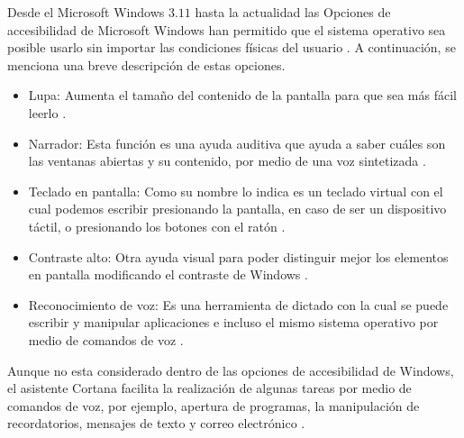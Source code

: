 Desde el Microsoft Windows $3.11$ \cite{RomeroZunica1998} hasta la actualidad las 
 Opciones de accesibilidad de Microsoft Windows han permitido que el
 sistema operativo sea posible usarlo sin importar las condiciones f\'isicas del
 usuario \cite{DanielHubbell2016}. A continuaci\'on, se menciona una breve 
 descripci\'on de estas opciones.

\begin{itemize}
	\item Lupa: Aumenta el tama\~no del contenido de la pantalla para que sea
	 m\'as f\'acil leerlo \cite{xatakaaccesiblilidad}.
	\item Narrador:  Esta funci\'on es una ayuda auditiva que ayuda a saber 
	 cu\'ales son las ventanas abiertas y su contenido, por medio de una voz
	 sintetizada \cite{xatakaaccesiblilidad}.
	\item Teclado en pantalla: Como su nombre lo indica es un teclado virtual
	 con el cual podemos escribir presionando la pantalla, en caso de ser un
	 dispositivo t\'actil, o presionando los botones con el rat\'on
	 \cite{xatakaaccesiblilidad}.
	\item Contraste alto: Otra ayuda visual para poder distinguir mejor los
	 elementos en pantalla modificando el contraste de Windows
	 \cite{xatakaaccesiblilidad}.
	\item Reconocimiento de voz: Es una herramienta de dictado con la cual
	 se puede escribir y manipular aplicaciones e incluso el mismo sistema
	 operativo por medio de comandos de voz \cite{support14213}.
\end{itemize}

Aunque no esta considerado dentro de las opciones de accesibilidad de Windows,
 el asistente Cortana facilita la realizaci\'on de algunas tareas por medio de
 comandos de voz, por ejemplo, apertura de programas, la manipulaci\'on de
 recordatorios, mensajes de texto y correo electr\'onico \cite{support17214}. 